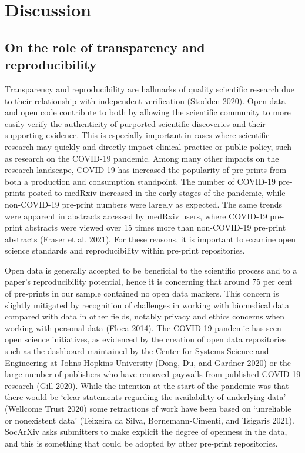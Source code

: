 \documentclass[
]{article}
\begin{document}
\hypertarget{discussion}{%
\section{Discussion}\label{discussion}}

\hypertarget{on-the-role-of-transparency-and-reproducibility}{%
\subsection{On the role of transparency and reproducibility}\label{on-the-role-of-transparency-and-reproducibility}}

Transparency and reproducibility are hallmarks of quality scientific research due to their relationship with independent verification (Stodden 2020). Open data and open code contribute to both by allowing the scientific community to more easily verify the authenticity of purported scientific discoveries and their supporting evidence. This is especially important in cases where scientific research may quickly and directly impact clinical practice or public policy, such as research on the COVID-19 pandemic. Among many other impacts on the research landscape, COVID-19 has increased the popularity of pre-prints from both a production and consumption standpoint. The number of COVID-19 pre-prints posted to medRxiv increased in the early stages of the pandemic, while non-COVID-19 pre-print numbers were largely as expected. The same trends were apparent in abstracts accessed by medRxiv users, where COVID-19 pre-print abstracts were viewed over 15 times more than non-COVID-19 pre-print abstracts (Fraser et al. 2021). For these reasons, it is important to examine open science standards and reproducibility within pre-print repositories.

Open data is generally accepted to be beneficial to the scientific process and to a paper's reproducibility potential, hence it is concerning that around 75 per cent of pre-prints in our sample contained no open data markers. This concern is slightly mitigated by recognition of challenges in working with biomedical data compared with data in other fields, notably privacy and ethics concerns when working with personal data (Floca 2014). The COVID-19 pandemic has seen open science initiatives, as evidenced by the creation of open data repositories such as the dashboard maintained by the Center for Systems Science and Engineering at Johns Hopkins University (Dong, Du, and Gardner 2020) or the large number of publishers who have removed paywalls from published COVID-19 research (Gill 2020). While the intention at the start of the pandemic was that there would be `clear statements regarding the availability of underlying data' (Wellcome Trust 2020) some retractions of work have been based on `unreliable or nonexistent data' (Teixeira da Silva, Bornemann-Cimenti, and Tsigaris 2021). SocArXiv asks submitters to make explicit the degree of openness in the data, and this is something that could be adopted by other pre-print repositories.
\end{document}
